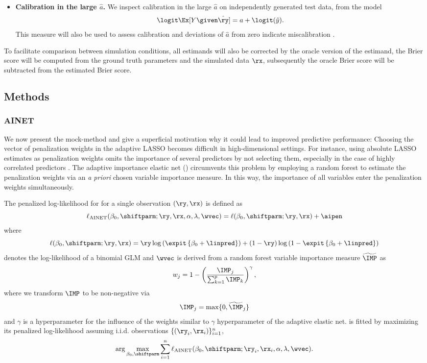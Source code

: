 \begin{subappendices}
\begin{itemize}
  \item \textbf{Calibration in the large $\hat a$.} We inspect calibration in the
  large $\hat a$ on independently generated test data, from the model
  $$\logit\Ex[Y \given \hat\ry] = a + \logit(\hat{y}).$$
        This measure will also be used to assess calibration and deviations of
        $\hat a$ from zero indicate miscalibration \citep{Steyerberg2019}.
\end{itemize}

To facilitate comparison between simulation conditions, all estimands will also
be corrected by the oracle version of the estimand, \eg{} the Brier score will
be computed from the ground truth parameters and the simulated data $\rx$,
subsequently the oracle Brier score will be subtracted from the estimated Brier
score.

\subsection{Methods} \label{sec6:methods}

\subsubsection{AINET}
We now present the mock-method and give a superficial motivation why it could
lead to improved predictive performance: Choosing the vector of penalization
weights in the adaptive LASSO becomes difficult in high-dimensional settings.
For instance, using absolute LASSO estimates as penalization weights omits the
importance of several predictors by not selecting them, especially in the case
of highly correlated predictors \citep{Algamal2015}. The adaptive importance
elastic net (\ainet{}) circumvents this problem by employing a random forest to
estimate the penalization weights via an \emph{a priori} chosen variable
importance measure. In this way, the importance of all variables enter the
penalization weights simultaneously.

The penalized log-likelihood for \ainet{} for a single observation $(\ry, \rx)$
is defined as
$$\ell_{\text{AINET}}(\beta_0, \shiftparm; \ry, \rx, \alpha, \lambda, \wvec) =
  \ell(\beta_0, \shiftparm; \ry, \rx) + \aipen$$
where
$$\ell(\beta_0, \shiftparm; \ry, \rx) =
\ry \log\left(\expit\left\{\beta_0 + \linpred\right\}\right) + (1 - \ry) \log\left(1 - \expit\left\{\beta_0 + \linpred\right\}\right)$$
denotes the log-likelihood of a binomial GLM and $\wvec$ is derived from a
random forest variable importance measure $\widetilde{\IMP}$ as
$$w_j = 1 - \left(\frac{\IMP_j}{\sum_{k=1}^p \IMP_k}\right)^\gamma,$$
where we transform $\IMP$ to be non-negative via
$$\IMP_j = \max\{0, \widetilde\IMP_j\}$$
and $\gamma$ is a hyperparameter for the influence of the weights similar to
$\gamma$ hyperparameter of the adaptive elastic net. \ainet{} is fitted by
maximizing its penalized log-likelihood assuming i.i.d. observations
$\{(\ry_i, \rx_i)\}_{i=1}^n$, \ie
$$\arg\max_{\beta_0, \shiftparm} \sum_{i = 1}^n \ell_{\text{AINET}}(\beta_0,
\shiftparm; \ry_i, \rx_i, \alpha, \lambda, \wvec).$$


\end{subappendices}
